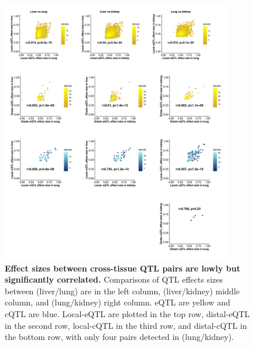 \documentclass[10pt,letterpaper,twoside]{article}
\begin{document}
\begin{figure}[hp]
\renewcommand{\familydefault}{\sfdefault}\normalfont
\centering
\includegraphics[width=0.9\textwidth, trim={0in 0in 0in 0in}, clip]{figs/effect_size_by_effect_size.pdf}
\caption{\textbf{Effect sizes between cross-tissue QTL pairs are lowly but significantly correlated.} 
Comparisons of QTL effects sizes between (liver/lung) are in the left column, (liver/kidney) middle column, and (lung/kidney) right column. eQTL are yellow and cQTL are blue. Local-eQTL are plotted in the top row, distal-eQTL in the second row, local-cQTL in the third row, and distal-cQTL in the bottom row, with only four pairs detected in (lung/kidney). 
\label{fig:qtl_effect_size_comparison}}
\end{figure}

\clearpage
\end{document}
